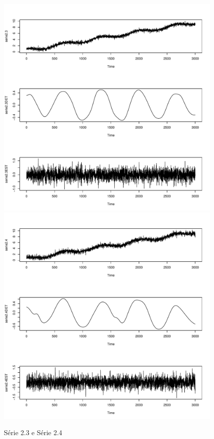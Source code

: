 \graphicspath{{imagens/}}
\begin{figure}[H]
\begin{center}
  \includegraphics[scale=0.43]{serie2_3.pdf} \quad
  \includegraphics[scale=0.43]{serie2_4.pdf}
  \caption{Série 2.3 e Série 2.4}

\end{center}
\end{figure}


